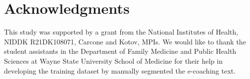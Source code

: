 \documentclass{amia}
\begin{document}
\section*{Acknowledgments}
This study was supported by a grant from the National Institutes of Health, NIDDK R21DK108071, Carcone and Kotov, MPIs. We would like to thank the student assistants in the Department of Family Medicine and Public Health Sciences at Wayne State University School of Medicine for their help in developing the training dataset by manually segmented the e-coaching text. 



\end{document}
